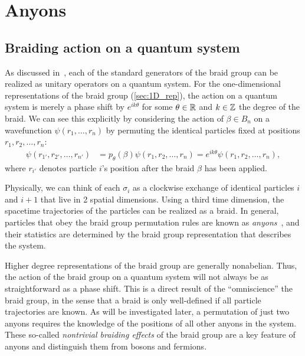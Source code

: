 \chapter{Anyons}\label{ch:anyons}

\section{Braiding action on a quantum system}
As discussed in~\cite{Deshmukh}, each of the standard generators of the braid group can be realized as unitary operators on a quantum system. For the one-dimensional representations of the braid group (\cref{sec:1D_rep}), the action on a quantum system is merely a phase shift by $e^{ik\theta}$ for some $\theta\in\mathbb{R}$ and $k\in\mathbb{Z}$ the degree of the braid. We can see this explicitly by considering the action of $\beta\in B_n$ on a wavefunction $\psi(r_1,\dots,r_n)$ by permuting the identical particles fixed at positions $r_1,r_2,\dots,r_n$:
\begin{align*}
    \psi(r_{1'},r_{2'},\dots,r_{n'}) &= p_\theta(\beta)\psi(r_1,r_2,\dots,r_n) = e^{ik\theta}\psi(r_1,r_2,\dots,r_n),
\end{align*}
where $r_{i'}$ denotes particle $i$'s position after the braid $\beta$ has been applied. 

Physically, we can think of each $\sigma_i$ as a clockwise exchange of identical particles $i$ and $i+1$ that live in 2 spatial dimensions. Using a third time dimension, the spacetime trajectories of the particles can be realized as a braid. In general, particles that obey the braid group permutation rules are known as \textit{anyons}~\cite{Wilczek1982}, and their statistics are determined by the braid group representation that describes the system.

Higher degree representations of the braid group are generally nonabelian. Thus, the action of the braid group on a quantum system will not always be as straightforward as a phase shift. This is a direct result of the ``omniscience'' the braid group, in the sense that a braid is only well-defined if all particle trajectories are known. As will be investigated later, a permutation of just two anyons requires the knowledge of the positions of all other anyons in the system. 
These so-called \textit{nontrivial braiding effects} of the braid group are a key feature of anyons and distinguish them from bosons and fermions.

